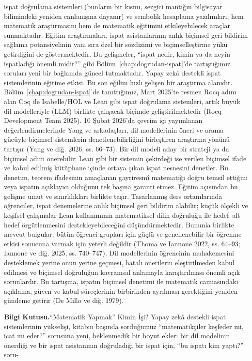 ispat doğrulama sistemleri (bunların bir kısmı, sezgici mantığın bilgisayar bilimindeki yeniden canlanışına dayanır) ve sembolik hesaplama yazılımları, hem matematik araştırmasını hem de matematik eğitimini etkileyebilecek araçlar sunmaktadır. Eğitim araştırmaları, ispat asistanlarının anlık biçimsel geri bildirim sağlama potansiyelinin yanı sıra özel bir sözdizimi ve biçimselleştirme yükü getirdiğini de göstermektedir. Bu gelişmeler, “ispat nedir, kimin ya da neyin ispatladığı önemli midir?” gibi Bölüm~\ref{chap:dogrudan-ispat}’de tartıştığımız soruları yeni bir bağlamda güncel tutmaktadır. Yapay zekâ destekli ispat sistemlerinin eğitime etkisi. Bu son eğilim hızlı gelişen bir araştırma alanıdır. Bölüm~\ref{chap:dogrudan-ispat}’de tanıttığımız, Mart 2025’te resmen Rocq adını alan Coq ile Isabelle/HOL ve Lean gibi ispat doğrulama sistemleri, artık büyük dil modelleriyle (LLM) birlikte çalışacak biçimde geliştirilmektedir (Rocq Development Team 2025). 10 Şubat 2026’da çevrim içi yayımlanan değerlendirmelerinde Yang ve arkadaşları, dil modellerinin öneri ve arama gücüyle biçimsel sistemlerin denetlenebilirliğini birleştiren araştırma yönünü tartışır (Yang ve diğ. 2026, ss. 66–73). Bir dil modeli aday bir strateji ya da biçimsel adım önerebilir; Lean gibi bir sistemin çekirdeği ise verilen biçimsel ifade ve kabul edilmiş kütüphane içinde ortaya çıkan ispat nesnesini denetler. Bu denetim, teorem ifadesinin amaçlanan gayriresmî matematiği doğru temsil ettiğini veya ispatın açıklayıcı olduğunu tek başına garanti etmez. Eğitim açısından bu gelişme umut ve sınırlılıkları birlikte taşır. Tasarlanmış ders ortamlarında öğrenciler, ispat denemelerine anlık biçimsel geri bildirim alabilir; küçük ölçekli ve keşifsel çalışmalar Lean kullanımının matematiksel dilin doğruluğu ile hedef–alt hedef örgütlenmesini destekleyebileceğini düşündürmektedir. Bununla birlikte mevcut bulgular, bütün öğrenci grupları için güçlü ve genellenebilir bir öğrenme etkisi sonucuna varmak için yeterli değildir (Thoma ve Iannone 2022, ss. 64–93; Iannone ve diğ. 2025, ss. 740–747). Dil modellerinin öğrencinin muhakemesini desteklemek yerine onun yerine geçmesi, hatalı önerilerin eleştirilmeden kabul edilmesi ve biçimsel doğruluğun kavramsal anlamayla karıştırılması önemli açık sorunlardır. Bu tartışma, ispatın biçimsel denetimi ile matematik camiasındaki açıklama, güven ve kabul süreçlerinin birbirinden ayrılması gerektiğini yeniden gündeme getirir (De Millo ve diğ. 1979).

\begin{tcolorbox}[bookbox,colback=cEx]\textbf{\textsf{\textcolor{cAcc}{Bilgi Kutusu.}}}\quad “Matematik Yapmak” Kimin İşi? Yapay zekâ destekli ispat sistemlerinin yükselişi, kitabın başında sorduğumuz “matematikçiler keşfeder mi, icat mı eder?” sorusuna yeni, beklenmedik bir boyut ekler: bir dil modelinin önerdiği ve bir ispat asistanının doğruladığı bir ispat için, “bu ispatı kim yaptı?” soru-\end{tcolorbox}

